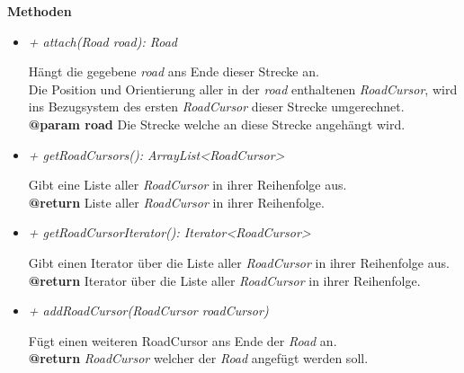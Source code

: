         
            \textbf{Methoden}					
            \begin{itemize}
                \item  \textit{+ attach(Road road): Road }
                    \begin{leftbar}[0.9\linewidth]
                        Hängt die gegebene \textit{road} ans Ende dieser Strecke an.\\
                        Die Position und Orientierung aller in der \textit{road} enthaltenen \textit{RoadCursor},
                        wird ins Bezugsystem des ersten \textit{RoadCursor} dieser Strecke umgerechnet.\\
                        \textbf{@param road} Die Strecke welche an diese Strecke angehängt wird.\\
                    \end{leftbar}
            
                \item  \textit{+ getRoadCursors(): ArrayList<RoadCursor>}
                    \begin{leftbar}[0.9\linewidth]
                        Gibt eine Liste aller \textit{RoadCursor} in ihrer Reihenfolge aus.\\
                        \textbf{@return} Liste aller \textit{RoadCursor} in ihrer Reihenfolge.\\
                    \end{leftbar}
            
                \item  \textit{+ getRoadCursorIterator(): Iterator<RoadCursor>}
                    \begin{leftbar}[0.9\linewidth]
                        Gibt einen Iterator über die Liste aller \textit{RoadCursor} in ihrer Reihenfolge aus.\\
                        \textbf{@return} Iterator über die Liste aller \textit{RoadCursor} in ihrer Reihenfolge.\\
                    \end{leftbar}
            
                \item  \textit{+ addRoadCursor(RoadCursor roadCursor)}
                    \begin{leftbar}[0.9\linewidth]
                        Fügt einen weiteren RoadCursor ans Ende der \textit{Road} an.\\
                        \textbf{@return} \textit{RoadCursor} welcher der \textit{Road} angefügt werden soll.\\
                    \end{leftbar}


\end{itemize}
